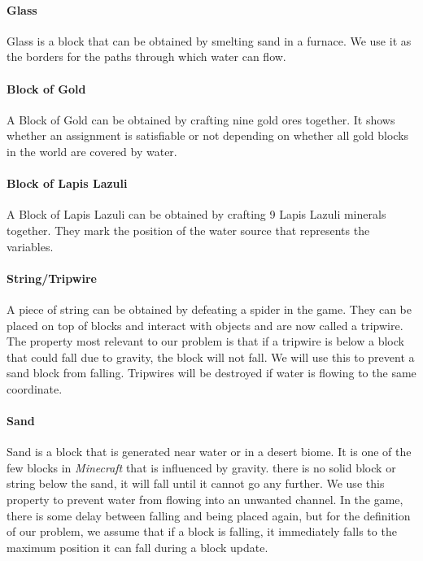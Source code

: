 \paragraph{Glass\cite{minecraftfandom:glass}}
Glass is a block that can be obtained by smelting sand in a furnace.
We use it as the borders for the paths through which water can flow.

\paragraph{Block of Gold\cite{minecraftfandom:bog}}
A Block of Gold can be obtained by crafting nine gold ores together.
\newline It shows whether an assignment is satisfiable or not depending on whether all gold blocks in the world are covered by water.

\paragraph{Block of Lapis Lazuli\cite{minecraftfandom:boll}}
A Block of Lapis Lazuli can be obtained by crafting 9 Lapis Lazuli minerals together.
They mark the position of the water source that represents the variables.

\paragraph{String/Tripwire\cite{minecraftfandom:string}}
A piece of string can be obtained by defeating a spider in the game.
They can be placed on top of blocks and interact with objects and are now called a tripwire.
The property most relevant to our problem is that if a tripwire is below a block that could fall due to gravity, the block will not fall.
We will use this to prevent a sand block from falling.
Tripwires will be destroyed if water is flowing to the same coordinate.

\paragraph{Sand\cite{minecraftfandom:sand}}
Sand is a block that is generated near water or in a desert biome.
It is one of the few blocks in \textit{Minecraft} that is influenced by gravity.
 there is no solid block or string below the sand, it will fall until it cannot go any further.
We use this property to prevent water from flowing into an unwanted channel. In the game, there is some delay between falling and being placed again, but for the definition of our problem, we assume that if a block is falling, it immediately falls to the maximum position it can fall during a block update. 

